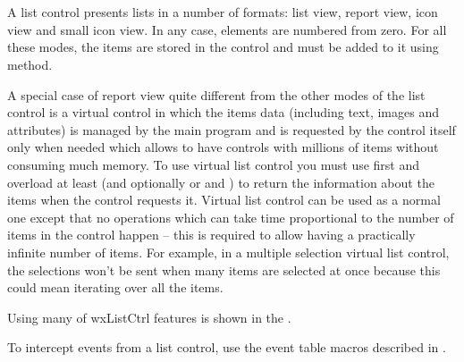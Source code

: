 
\section{}\label{wxlistctrl}

A list control presents lists in a number of formats: list view, report view,
icon view and small icon view. In any case, elements are numbered from zero.
For all these modes, the items are stored in the control and must be added to
it using  method.

A special case of report view quite different from the other modes of the list
control is a virtual control in which the items data (including text, images
and attributes) is managed by the main program and is requested by the control
itself only when needed which allows to have controls with millions of items
without consuming much memory. To use virtual list control you must use
 first and overload at least
 (and optionally
 or  and
) to return the information
about the items when the control requests it. Virtual list control can be used
as a normal one except that no operations which can take time proportional to
the number of items in the control happen -- this is required to allow having a
practically infinite number of items. For example, in a multiple selection
virtual list control, the selections won't be sent when many items are selected
at once because this could mean iterating over all the items.

Using many of wxListCtrl features is shown in the
.

To intercept events from a list control, use the event table macros described
in .


\\
\\
\\

